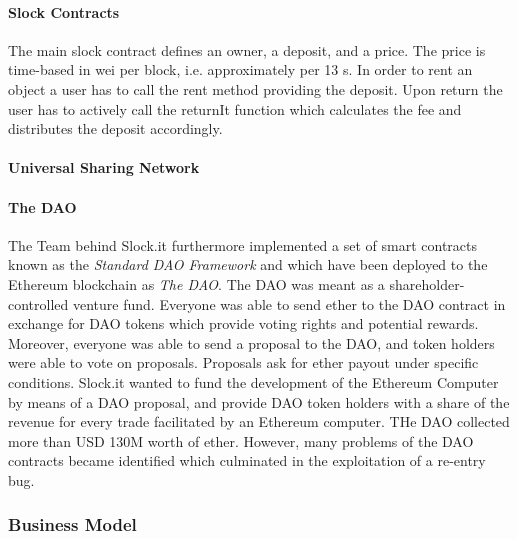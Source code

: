 \paragraph{Slock Contracts}

The main slock contract defines an owner, a deposit, and a price. The price is time-based in wei per block, i.e. approximately per 13 s. In order to rent an object a user has to call the rent method providing the deposit. Upon return the user has to actively call the returnIt function which calculates the fee and distributes the deposit accordingly. 

\paragraph{Universal Sharing Network}

\paragraph{The DAO}

The Team behind Slock.it furthermore implemented a set of smart contracts known as the \emph{Standard DAO Framework} and which have been deployed to the Ethereum blockchain as \emph{The DAO}. The DAO was meant as a shareholder-controlled venture fund. Everyone was able to send ether to the DAO contract in exchange for DAO tokens which provide voting rights and potential rewards. Moreover, everyone was able to send a proposal to the DAO, and token holders were able to vote on proposals. Proposals ask for ether payout under specific conditions. Slock.it wanted to fund the development of the Ethereum Computer by means of a DAO proposal, and provide DAO token holders with a share of the revenue for every trade facilitated by an Ethereum computer. THe DAO collected more than USD 130M worth of ether. However, many problems of the DAO contracts became identified which culminated in the exploitation of a re-entry bug.

\subsubsection{Business Model}



